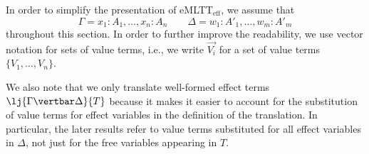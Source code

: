In order to simplify the presentation of eMLTT$_{\text{eff}}$, we assume that
\[
\Gamma = x_1 \!:\! A_1, \ldots, x_n \!:\! A_n
\qquad
\Delta = w_1 \!:\! A'_1, \ldots, w_m \!:\! A'_m
\] 
throughout this section.
In order to further improve the readability, we use vector notation for sets of value terms, i.e., we write $\overrightarrow{V_i}$ for a set of value terms $\{V_1, \ldots, V_n\}$. 

We also note that we only translate well-formed effect terms $\lj {\Gamma \vertbar \Delta} {T}$ because it makes it easier to account for the substitution of value terms for effect variables in the definition of the translation. In particular, the later results refer to value terms substituted for all effect variables in $\Delta$, not just for the free variables appearing in $T$.

